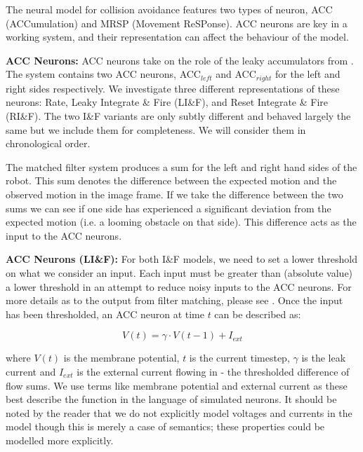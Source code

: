 \documentclass[a4paper,11pt,twoside,openright]{article}
\begin{document}
The neural model for collision avoidance features two types of neuron, ACC
(ACCumulation) and MRSP (Movement ReSPonse). ACC neurons are key in a working
system, and their representation can affect the behaviour of the model.
\newline\par

\textbf{ACC Neurons:}
ACC neurons take on the role of the leaky accumulators from \cite{Mitchell2018,
  Stewart2010}. The system contains two ACC neurons, ACC$_{left}$ and
ACC$_{right}$ for the left and right sides respectively. We investigate three
different representations of these neurons: Rate, Leaky Integrate \& Fire
(LI\&F), and Reset Integrate \& Fire (RI\&F). The two I\&F variants are only
subtly different and behaved largely the same but we include them for
completeness. We will consider them in chronological order.
\newline\par

The matched filter system produces a sum for the left and right hand sides of the
robot. This sum denotes the difference between the expected motion and the
observed motion in the image frame. If we take the difference between the two
sums we can see if one side has experienced a significant deviation from the
expected motion (i.e. a looming obstacle on that side). This difference acts
as the input to the ACC neurons.
\newline\par

\textbf{ACC Neurons (LI\&F):} For both I\&F models, we need to set a
lower threshold on what we consider an input.  Each input must be greater
than (absolute value) a lower threshold in an attempt to reduce noisy
inputs to the ACC neurons. For more details as to the output from
filter matching, please see \cite{Mitchell2018}. Once the input has
been thresholded, an ACC neuron at time $t$ can be described as:

\begin{equation}
  V(t) = \gamma \cdot V(t-1) + I_{ext}
\end{equation}

where $V(t)$ is the membrane potential, $t$ is the current timestep,
$\gamma$ is the leak current and $I_{ext}$ is the external current
flowing in - the thresholded difference of flow sums.  We use terms
like membrane potential and external current as these best
describe the function in the language of simulated neurons. It should
be noted by the reader that we do not explicitly model voltages and
currents in the model though this is merely a case of semantics; these
properties could be modelled more explicitly.
\newline\par
\end{document}
